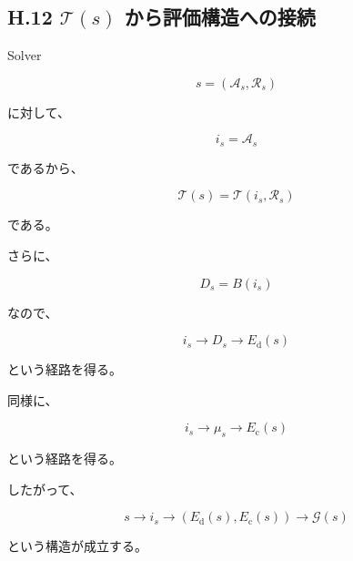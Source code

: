 \documentclass[a4paper,11pt]{article}
\newcommand{\Aset}{\mathcal{A}}
\newcommand{\Rset}{\mathcal{R}}
\newcommand{\Eval}{\mathcal{G}}
\begin{document}

\subsection{H.12 $\mathcal{T}(s)$ から評価構造への接続}

Solver

\begin{equation}
    s=(\Aset_s,\Rset_s)
\end{equation}

に対して、

\begin{equation}
    i_s=\Aset_s
\end{equation}

であるから、

\begin{equation}
    \mathcal{T}(s)
    =
    \mathcal{T}(i_s,\Rset_s)
\end{equation}

である。

さらに、

\begin{equation}
    D_s=B(i_s)
\end{equation}

なので、

\begin{equation}
    i_s
    \longrightarrow
    D_s
    \longrightarrow
    E_{\mathrm d}(s)
\end{equation}

という経路を得る。

同様に、

\begin{equation}
    i_s
    \longrightarrow
    \mu_s
    \longrightarrow
    E_{\mathrm c}(s)
\end{equation}

という経路を得る。

したがって、

\begin{equation}
    \boxed{
        s
        \longrightarrow
        i_s
        \longrightarrow
        \left(
            E_{\mathrm d}(s),
            E_{\mathrm c}(s)
        \right)
        \longrightarrow
        \Eval(s)
    }
\end{equation}

という構造が成立する。

\end{document}
